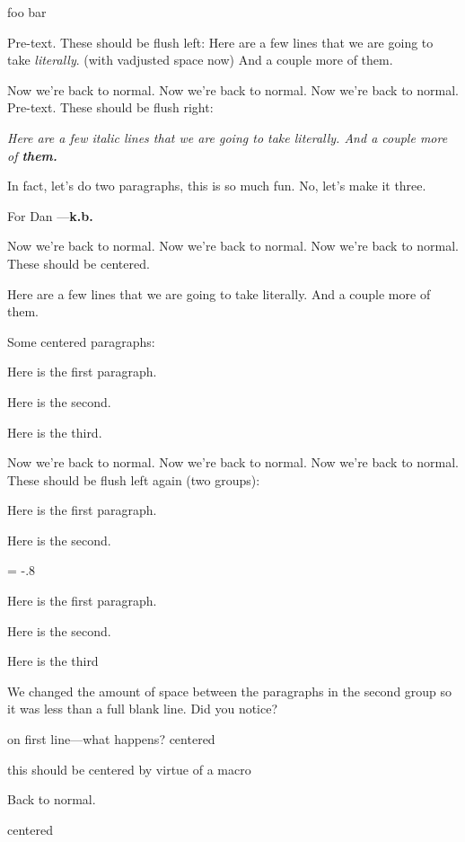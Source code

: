 

{\center foo
bar
}

\loggingall

Pre-text.  These should be flush left:
{\flushleft
Here are a few
lines that we are
\vadjust{\bigskip}going to take {\it literally}. (with vadjusted space now)
And a couple more
of them.}

Now we're back to normal.
Now we're back to normal.
Now we're back to normal.
Pre-text.  These should be flush right:

{\it \flushright
Here are a few italic
lines that we are
\vadjust{\bigskip}going to take literally.
And a couple more
of {\bf them.}

In fact, let's do two paragraphs,
this is so much fun.  No, let's make it three.

   For Dan
   ---{\bf k.b.}
}

Now we're back to normal. 
Now we're back to normal. 
Now we're back to normal. 
These should be centered.

{\center
Here are a few
lines that we are
\vadjust{\bigskip}going to take literally.
And a couple more
of them.}

Some centered paragraphs:
{\center
  Here is the first paragraph.
  
  Here is the second.
  
  Here is the third.
}

Now we're back to normal. 
Now we're back to normal. 
Now we're back to normal. 
These should be flush left again (two groups):

{\flushleft
  Here is the first paragraph.
  
  Here is the second.
}

\blanklineskipamount = -.8\baselineskip
{\flushleft
  Here is the first paragraph.
  
  Here is the second.
  
  Here is the third
}

We changed the amount of space between the paragraphs in the second
group so it was less than a full blank line.  Did you notice?

\scrollmode

{ \center on first line---what happens?
centered
}

\def\title{\begingroup\center}
\def\endtitle{\endgroup}

\title
this should be centered
by virtue of a macro
\endtitle

Back to normal.

{\center
centered
%
\flushleft %
}

\bye
